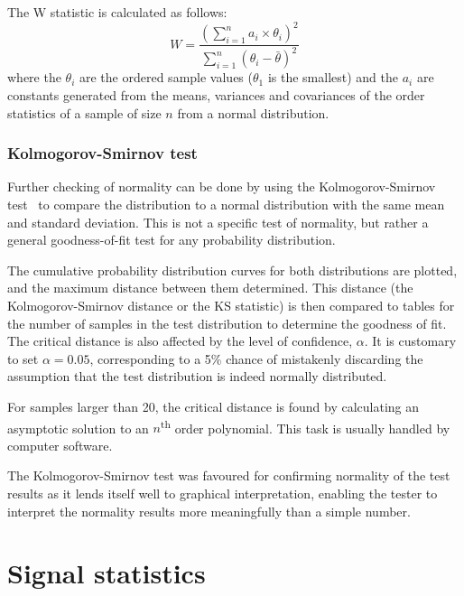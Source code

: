 The W statistic is calculated as follows: 
\begin{equation} 
  \label{eq:shipirowilk} 
  W = \frac{
    \left( \displaystyle \sum_{i=1}^n {a_i \times \theta_i} \right)^2}
  {\displaystyle \sum_{i=1}^n 
    \left ( \theta_i - \bar{\theta} \right )^2}
\end{equation}
where the $\theta_i$ are the ordered sample values ($\theta_1$ is the smallest) and the $a_i$ are constants generated from the means, variances and covariances of the order statistics of a sample of size $n$ from a normal distribution.

\subsubsection{Kolmogorov-Smirnov test}\label{sec:kolm-smirn-test}
Further checking of normality can be done by using the Kolmogorov-Smirnov test~\citep[392--394]{chakravarti.laha.ea1967handbook} to compare the distribution to a normal distribution with the same mean and standard deviation.
This is not a specific test of normality, but rather a general goodness-of-fit test for any probability distribution.

The cumulative probability distribution curves for both distributions are plotted, and the maximum distance between them determined.  
This distance (the Kolmogorov-Smirnov distance or the KS statistic) is then compared to tables for the number of samples in the test distribution to determine the goodness of fit.  
The critical distance is also affected by the level of confidence, $\alpha$.  
It is customary to set $\alpha=\num{0.05}$, corresponding to a 5\% chance of mistakenly discarding the assumption that the test distribution is indeed normally distributed.

For samples larger than 20, the critical distance is found by calculating an asymptotic solution to an $n$\textsuperscript{th} order polynomial.  
This task is usually handled by computer software.

The Kolmogorov-Smirnov test was favoured for confirming normality of the test results as it lends itself well to graphical interpretation, enabling the tester to interpret the normality results more meaningfully than a simple number.

\section{Signal statistics}

